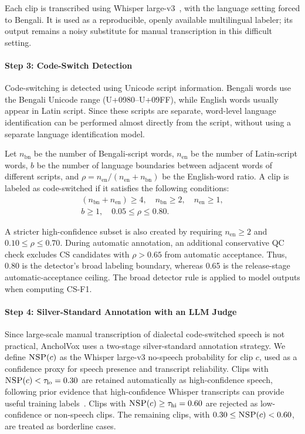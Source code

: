 \documentclass[journal]{IEEEtran}
\begin{document}
Each clip is transcribed using Whisper large-v3~\cite{radford2023whisper}, with the language setting forced to Bengali. It is used as a reproducible, openly available multilingual labeler; its output remains a noisy substitute for manual transcription in this difficult setting.

\paragraph*{Step 3: Code-Switch Detection}

Code-switching is detected using Unicode script information. Bengali words use the Bengali Unicode range (U+0980--U+09FF), while English words usually appear in Latin script. Since these scripts are separate, word-level language identification can be performed almost directly from the script, without using a separate language identification model.

Let $n_{\mathrm{bn}}$ be the number of Bengali-script words, $n_{\mathrm{en}}$ be the number of Latin-script words, $b$ be the number of language boundaries between adjacent words of different scripts, and $\rho = n_{\mathrm{en}}/(n_{\mathrm{en}}+n_{\mathrm{bn}})$ be the English-word ratio. A clip is labeled as code-switched if it satisfies the following conditions:
\begin{equation}
\begin{aligned}
(n_{\mathrm{bn}} + n_{\mathrm{en}}) \ge 4,\quad
n_{\mathrm{bn}} \ge 2,\quad
n_{\mathrm{en}} \ge 1,\\
b \ge 1,\quad
0.05 \le \rho \le 0.80 .
\end{aligned}
\label{eq:csrule}
\end{equation}

A stricter high-confidence subset is also created by requiring $n_{\mathrm{en}} \ge 2$ and $0.10 \le \rho \le 0.70$. During automatic annotation, an additional conservative QC check excludes CS candidates with $\rho>0.65$ from automatic acceptance. Thus, 0.80 is the detector's broad labeling boundary, whereas 0.65 is the release-stage automatic-acceptance ceiling. The broad detector rule is applied to model outputs when computing CS-F1.

\paragraph*{Step 4: Silver-Standard Annotation with an LLM Judge}

Since large-scale manual transcription of dialectal code-switched speech is not practical, AncholVox uses a two-stage silver-standard annotation strategy. We define $\textsc{NSP}(c)$ as the Whisper large-v3 no-speech probability for clip $c$, used as a confidence proxy for speech presence and transcript reliability. Clips with $\textsc{NSP}(c)<\tau_{\mathrm{lo}}=0.30$ are retained automatically as high-confidence speech, following prior evidence that high-confidence Whisper transcripts can provide useful training labels~\cite{yang2025gigaspeech2}. Clips with $\textsc{NSP}(c)\ge\tau_{\mathrm{hi}}=0.60$ are rejected as low-confidence or non-speech clips. The remaining clips, with $0.30 \le \textsc{NSP}(c)<0.60$, are treated as borderline cases.
\end{document}
